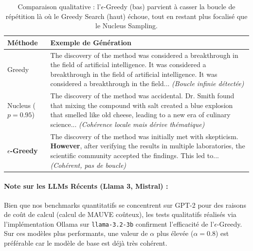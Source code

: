 \documentclass[12pt,a4paper]{article}
\begin{document}
\begin{table}[H]
\centering
\small
\begin{tabular}{@{}lp{10cm}@{}}
\toprule
\textbf{M\'ethode} & \textbf{Exemple de G\'en\'eration} \\ \midrule

Greedy & The discovery of the method was considered a breakthrough in the field of artificial intelligence. It was considered a breakthrough in the field of artificial intelligence. It was considered a breakthrough in the field... \textit{(Boucle infinie d\'etect\'ee)} \\ \midrule

Nucleus ($p=0.95$) & The discovery of the method was accidental. Dr. Smith found that mixing the compound with salt created a blue explosion that smelled like old cheese, leading to a new era of culinary science... \textit{(Coh\'erence locale mais d\'erive th\'ematique)} \\ \midrule

\textbf{$\epsilon$-Greedy} & The discovery of the method was initially met with skepticism. \textbf{However}, after verifying the results in multiple laboratories, the scientific community accepted the findings. This led to... \textit{(Coh\'erent, pas de boucle)} \\ 

\bottomrule
\end{tabular}
\caption{Comparaison qualitative : l'$\epsilon$-Greedy (bas) parvient \`a casser la boucle de r\'ep\'etition l\`a o\`u le Greedy Search (haut) \'echoue, tout en restant plus focalis\'e que le Nucleus Sampling.}
\label{tab:qualitative}
\end{table}

\paragraph{Note sur les LLMs R\'ecents (Llama 3, Mistral) :}
Bien que nos benchmarks quantitatifs se concentrent sur GPT-2 pour des raisons de co\^ut de calcul (calcul de MAUVE co\^uteux), les tests qualitatifs r\'ealis\'es via l'impl\'ementation Ollama sur \texttt{llama-3.2-3b} confirment l'efficacit\'e de l'$\epsilon$-Greedy. Sur ces mod\`eles plus performants, une valeur de $\alpha$ plus \'elev\'ee ($\alpha=0.8$) est pr\'ef\'erable car le mod\`ele de base est d\'ej\`a tr\`es coh\'erent.
\end{document}
